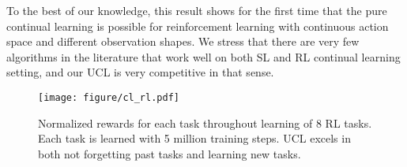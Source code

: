 To the best of our knowledge, this result shows for the first time that the pure continual learning is possible for reinforcement learning with continuous action space and different observation shapes. We stress that there are very few algorithms in the literature that work well on both SL and RL continual learning setting, and our UCL is very competitive in that sense. 
\vspace{-.051in}
\begin{figure}[th]
    \centering
    \texttt{[image: figure/cl\_rl.pdf]}
    \vspace{-.2in}
    \caption{Normalized rewards for each task throughout learning of 8 RL tasks. Each task is learned with 5 million training steps. UCL excels in both not forgetting past tasks and learning new tasks.}
    \label{fig:RL_results}\vspace{-.1in}
\end{figure}



















